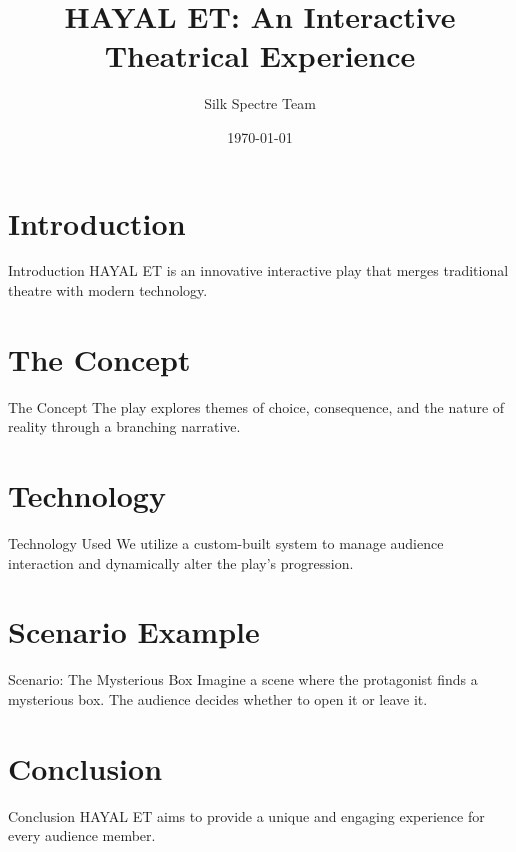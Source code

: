 \documentclass[aspectratio=169]{beamer}
\title{HAYAL ET: An Interactive Theatrical Experience}
\author{Silk Spectre Team}
\institute{Interactive Play Project}
\date{\today}
\begin{document}
\frame{\titlepage}

\section{Introduction}
\begin{frame}{Introduction}
    HAYAL ET is an innovative interactive play that merges traditional theatre with modern technology.
\end{frame}

\section{The Concept}
\begin{frame}{The Concept}
    The play explores themes of choice, consequence, and the nature of reality through a branching narrative.
\end{frame}

\section{Technology}
\begin{frame}{Technology Used}
    We utilize a custom-built system to manage audience interaction and dynamically alter the play's progression.
\end{frame}

\section{Scenario Example}
\begin{frame}{Scenario: The Mysterious Box}
    Imagine a scene where the protagonist finds a mysterious box. The audience decides whether to open it or leave it.
\end{frame}

\section{Conclusion}
\begin{frame}{Conclusion}
    HAYAL ET aims to provide a unique and engaging experience for every audience member.
\end{frame}
\end{document}
